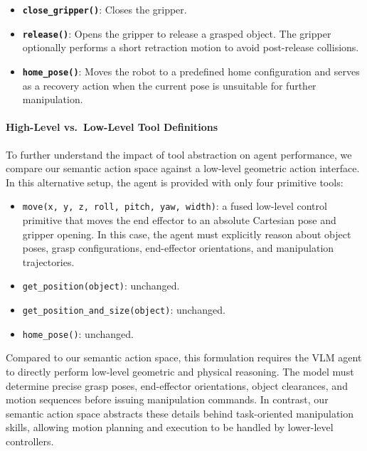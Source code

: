 \begin{itemize}
\item \textbf{\texttt{close\_gripper()}}: Closes the gripper.

\item \textbf{\texttt{release()}}: Opens the gripper to release a grasped object. The gripper optionally performs a short retraction motion to avoid post-release collisions.

\item \textbf{\texttt{home\_pose()}}: Moves the robot to a predefined home configuration and serves as a recovery action when the current pose is unsuitable for further manipulation.

\end{itemize}

\paragraph{High-Level vs.\ Low-Level Tool Definitions}

To further understand the impact of tool abstraction on agent performance, we compare our semantic action space against a low-level geometric action interface. In this alternative setup, the agent is provided with only four primitive tools:

\begin{itemize}
    \item \texttt{move(x, y, z, roll, pitch, yaw, width)}: a fused low-level control primitive that moves the end effector to an absolute Cartesian pose and gripper opening. In this case, the agent must explicitly reason about object poses, grasp configurations, end-effector orientations, and manipulation trajectories.
    
    \item \texttt{get\_position(object)}: unchanged.
    
    \item \texttt{get\_position\_and\_size(object)}: unchanged.
    
    \item \texttt{home\_pose()}: unchanged.
\end{itemize}

Compared to our semantic action space, this formulation requires the VLM agent to directly perform low-level geometric and physical reasoning. The model must determine precise grasp poses, end-effector orientations, object clearances, and motion sequences before issuing manipulation commands. In contrast, our semantic action space abstracts these details behind task-oriented manipulation skills, allowing motion planning and execution to be handled by lower-level controllers.

